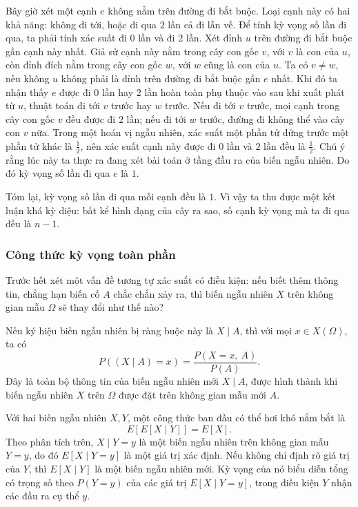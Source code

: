 \documentclass[11pt]{article}
\begin{document}
Bây giờ xét một cạnh \(e\) không nằm trên đường đi bắt buộc. Loại cạnh này
có hai khả năng: không đi tới, hoặc đi qua \(2\) lần cả đi lẫn về. Để tính
kỳ vọng số lần đi qua, ta phải tính xác suất đi \(0\) lần và đi \(2\) lần.
Xét đỉnh \(u\) trên đường đi bắt buộc gần cạnh này nhất. Giả sử cạnh này nằm
trong cây con gốc \(v\), với \(v\) là con của \(u\), còn đỉnh đích nằm trong
cây con gốc \(w\), với \(w\) cũng là con của \(u\). Ta có \(v\ne w\), nếu
không \(u\) không phải là đỉnh trên đường đi bắt buộc gần \(e\) nhất. Khi đó
ta nhận thấy \(e\) được đi \(0\) lần hay \(2\) lần hoàn toàn phụ thuộc vào
sau khi xuất phát từ \(u\), thuật toán đi tới \(v\) trước hay \(w\) trước.
Nếu đi tới \(v\) trước, mọi cạnh trong cây con gốc \(v\) đều được đi \(2\)
lần; nếu đi tới \(w\) trước, đường đi không thể vào cây con \(v\) nữa. Trong
một hoán vị ngẫu nhiên, xác suất một phần tử đứng trước một phần tử khác là
\(\frac12\), nên xác suất cạnh này được đi \(0\) lần và \(2\) lần đều là
\(\frac12\). Chú ý rằng lúc này ta thực ra đang xét bài toán ở tầng đầu ra
của biến ngẫu nhiên. Do đó kỳ vọng số lần đi qua \(e\) là \(1\).

Tóm lại, kỳ vọng số lần đi qua mỗi cạnh đều là \(1\). Vì vậy ta thu được một
kết luận khá kỳ diệu: bất kể hình dạng của cây ra sao, số cạnh kỳ vọng mà ta
đi qua đều là \(n-1\).

\subsubsection{Công thức kỳ vọng toàn phần}

Trước hết xét một vấn đề tương tự xác suất có điều kiện: nếu biết thêm thông
tin, chẳng hạn biến cố \(A\) chắc chắn xảy ra, thì biến ngẫu nhiên \(X\) trên
không gian mẫu \(\Omega\) sẽ thay đổi như thế nào?

Nếu ký hiệu biến ngẫu nhiên bị ràng buộc này là \(X\mid A\), thì với mọi
\(x\in X(\Omega)\), ta có
\[
  P((X\mid A)=x)=\frac{P(X=x,\ A)}{P(A)}.
\]
Đây là toàn bộ thông tin của biến ngẫu nhiên mới \(X\mid A\), được hình
thành khi biến ngẫu nhiên \(X\) trên \(\Omega\) được đặt trên không gian mẫu
mới \(A\).

Với hai biến ngẫu nhiên \(X,Y\), một công thức ban đầu có thể hơi khó nắm bắt
là
\[
  E[E[X\mid Y]]=E[X].
\]
Theo phân tích trên, \(X\mid Y=y\) là một biến ngẫu nhiên trên không gian mẫu
\(Y=y\), do đó \(E[X\mid Y=y]\) là một giá trị xác định. Nếu không chỉ định rõ
giá trị của \(Y\), thì \(E[X\mid Y]\) là một biến ngẫu nhiên mới. Kỳ vọng của
nó biểu diễn tổng có trọng số theo \(P(Y=y)\) của các giá trị
\(E[X\mid Y=y]\), trong điều kiện \(Y\) nhận các đầu ra cụ thể \(y\).
\end{document}
